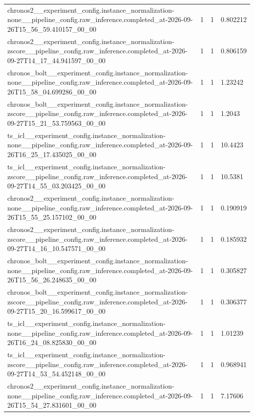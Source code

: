 \begin{tabular}{llll}
chronos2\_\_experiment\_config.instance\_normalization-none\_\_pipeline\_config.raw\_inference.completed\_at-2026-09-26T15\_56\_59.410157\_00\_00 & 1 & 1 & 0.802212 \\
chronos2\_\_experiment\_config.instance\_normalization-zscore\_\_pipeline\_config.raw\_inference.completed\_at-2026-09-27T14\_17\_44.941597\_00\_00 & 1 & 1 & 0.806159 \\
chronos\_bolt\_\_experiment\_config.instance\_normalization-none\_\_pipeline\_config.raw\_inference.completed\_at-2026-09-26T15\_58\_04.699286\_00\_00 & 1 & 1 & 1.23242 \\
chronos\_bolt\_\_experiment\_config.instance\_normalization-zscore\_\_pipeline\_config.raw\_inference.completed\_at-2026-09-27T15\_21\_53.759563\_00\_00 & 1 & 1 & 1.2043 \\
ts\_icl\_\_experiment\_config.instance\_normalization-none\_\_pipeline\_config.raw\_inference.completed\_at-2026-09-26T16\_25\_17.435025\_00\_00 & 1 & 1 & 10.4423 \\
ts\_icl\_\_experiment\_config.instance\_normalization-zscore\_\_pipeline\_config.raw\_inference.completed\_at-2026-09-27T14\_55\_03.203425\_00\_00 & 1 & 1 & 10.5381 \\
chronos2\_\_experiment\_config.instance\_normalization-none\_\_pipeline\_config.raw\_inference.completed\_at-2026-09-26T15\_55\_25.157102\_00\_00 & 1 & 1 & 0.190919 \\
chronos2\_\_experiment\_config.instance\_normalization-zscore\_\_pipeline\_config.raw\_inference.completed\_at-2026-09-27T14\_16\_10.547571\_00\_00 & 1 & 1 & 0.185932 \\
chronos\_bolt\_\_experiment\_config.instance\_normalization-none\_\_pipeline\_config.raw\_inference.completed\_at-2026-09-26T15\_56\_26.248635\_00\_00 & 1 & 1 & 0.305827 \\
chronos\_bolt\_\_experiment\_config.instance\_normalization-zscore\_\_pipeline\_config.raw\_inference.completed\_at-2026-09-27T15\_20\_16.599617\_00\_00 & 1 & 1 & 0.306377 \\
ts\_icl\_\_experiment\_config.instance\_normalization-none\_\_pipeline\_config.raw\_inference.completed\_at-2026-09-26T16\_24\_08.825830\_00\_00 & 1 & 1 & 1.01239 \\
ts\_icl\_\_experiment\_config.instance\_normalization-zscore\_\_pipeline\_config.raw\_inference.completed\_at-2026-09-27T14\_53\_54.452148\_00\_00 & 1 & 1 & 0.968941 \\
chronos2\_\_experiment\_config.instance\_normalization-none\_\_pipeline\_config.raw\_inference.completed\_at-2026-09-26T15\_54\_27.831601\_00\_00 & 1 & 1 & 7.17606 \\

\end{tabular}
